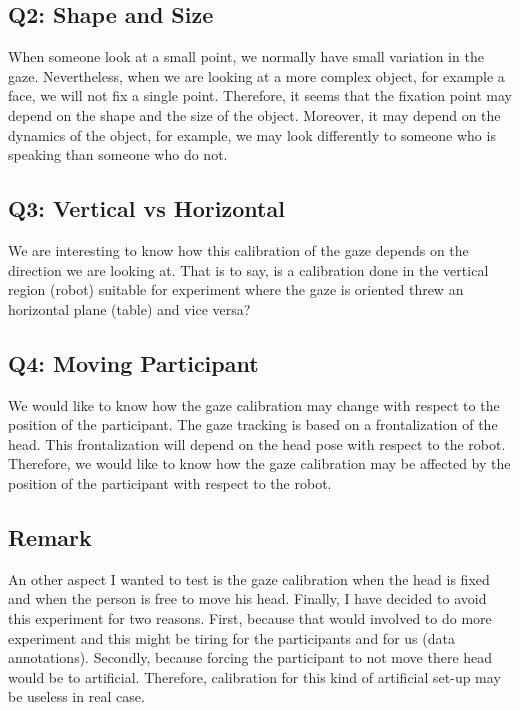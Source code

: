 \documentclass[11pt,a4paper]{article}
\begin{document}
\subsection{Q2: Shape and Size}
When someone look at a small point, we normally have small variation in the gaze. Nevertheless, when we are looking at a more complex object, for example a face, we will not fix a single point. Therefore, it seems that the fixation point may depend on the shape and the size of the object. Moreover, it may depend on the dynamics of the object, for example, we may look differently to someone who is speaking than someone who do not.
\subsection{Q3: Vertical vs Horizontal}
We are interesting to know how this calibration of the gaze depends on the direction we are looking at. That is to say, is a calibration done in the vertical region (robot) suitable for experiment where the gaze is oriented threw an horizontal plane (table) and vice versa?
\subsection{Q4: Moving Participant}
We would like to know how the gaze calibration may change with respect to the position of the participant. The gaze tracking is based on a frontalization of the head. This frontalization will depend on the head pose with respect to the robot. Therefore, we would like to know how the gaze calibration may be affected by the position of the participant with respect to the robot.
\subsection{Remark}
An other aspect I wanted to test is the gaze calibration when the head is fixed and when the person is free to move his head. Finally, I have decided to avoid this experiment for two reasons. First, because that would involved to do more experiment and this might be tiring for the participants and for us (data annotations). Secondly, because forcing the participant to not move there head would be to artificial. Therefore, calibration for this kind of artificial set-up may be useless in real case.
\end{document}
